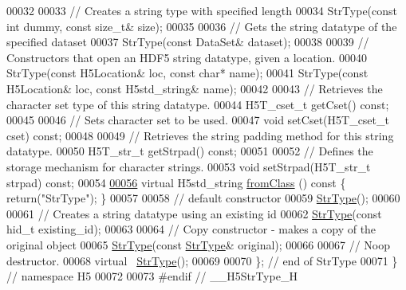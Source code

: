 \begin{DoxyCode}
00032 
00033         \textcolor{comment}{// Creates a string type with specified length}
00034         StrType(\textcolor{keyword}{const} \textcolor{keywordtype}{int} dummy, \textcolor{keyword}{const} \textcolor{keywordtype}{size\_t}& size);
00035 
00036         \textcolor{comment}{// Gets the string datatype of the specified dataset}
00037         StrType(\textcolor{keyword}{const} DataSet& dataset);
00038 
00039         \textcolor{comment}{// Constructors that open an HDF5 string datatype, given a location.}
00040         StrType(\textcolor{keyword}{const} H5Location& loc, \textcolor{keyword}{const} \textcolor{keywordtype}{char}* name);
00041         StrType(\textcolor{keyword}{const} H5Location& loc, \textcolor{keyword}{const} H5std\_string& name);
00042 
00043         \textcolor{comment}{// Retrieves the character set type of this string datatype.}
00044         H5T\_cset\_t getCset() \textcolor{keyword}{const};
00045 
00046         \textcolor{comment}{// Sets character set to be used.}
00047         \textcolor{keywordtype}{void} setCset(H5T\_cset\_t cset) \textcolor{keyword}{const};
00048 
00049         \textcolor{comment}{// Retrieves the string padding method for this string datatype.}
00050         H5T\_str\_t getStrpad() \textcolor{keyword}{const};
00051 
00052         \textcolor{comment}{// Defines the storage mechanism for character strings.}
00053         \textcolor{keywordtype}{void} setStrpad(H5T\_str\_t strpad) \textcolor{keyword}{const};
00054 
\hyperlink{class_h5_1_1_str_type_acafed9b8354f9578341682e29b5b6712}{00056}         \textcolor{keyword}{virtual} H5std\_string \hyperlink{class_h5_1_1_str_type_acafed9b8354f9578341682e29b5b6712}{fromClass} ()\textcolor{keyword}{ const }\{ \textcolor{keywordflow}{return}(\textcolor{stringliteral}{"StrType"}); \}
00057 
00058         \textcolor{comment}{// default constructor}
00059         \hyperlink{class_h5_1_1_str_type}{StrType}();
00060 
00061         \textcolor{comment}{// Creates a string datatype using an existing id}
00062         \hyperlink{class_h5_1_1_str_type}{StrType}(\textcolor{keyword}{const} hid\_t existing\_id);
00063 
00064         \textcolor{comment}{// Copy constructor - makes a copy of the original object}
00065         \hyperlink{class_h5_1_1_str_type}{StrType}(\textcolor{keyword}{const} \hyperlink{class_h5_1_1_str_type}{StrType}& original);
00066 
00067         \textcolor{comment}{// Noop destructor.}
00068         \textcolor{keyword}{virtual} ~\hyperlink{class_h5_1_1_str_type}{StrType}();
00069 
00070 \}; \textcolor{comment}{// end of StrType}
00071 \} \textcolor{comment}{// namespace H5}
00072 
00073 \textcolor{preprocessor}{#endif // \_\_H5StrType\_H}
\end{DoxyCode}

